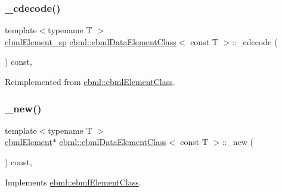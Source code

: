 \subsubsection{\texorpdfstring{\+\_\+cdecode()}{\_cdecode()}\hspace{0.1cm}{\footnotesize\ttfamily [2/2]}}
{\footnotesize\ttfamily template$<$typename T $>$ \\
\mbox{\hyperlink{namespaceebml_adad533b7705a16bb360fe56380c5e7be}{ebml\+Element\+\_\+sp}} \mbox{\hyperlink{classebml_1_1ebmlDataElementClass}{ebml\+::ebml\+Data\+Element\+Class}}$<$ const T $>$\+::\+\_\+cdecode (\begin{DoxyParamCaption}\item[{const \mbox{\hyperlink{classebml_1_1parseFile}{parse\+File}} \&}]{ }\end{DoxyParamCaption}) const\hspace{0.3cm}{\ttfamily [protected]}, {\ttfamily [virtual]}}



Reimplemented from \mbox{\hyperlink{classebml_1_1ebmlElementClass_ae423476637d4ca052cd7aa0047f2b3eb}{ebml\+::ebml\+Element\+Class}}.

\mbox{\label{classebml_1_1ebmlDataElementClass_3_01const_01T_01_4_ac0f96ad77925a1236e1a637db0d5a356}} 
\subsubsection{\texorpdfstring{\+\_\+new()}{\_new()}}
{\footnotesize\ttfamily template$<$typename T $>$ \\
\mbox{\hyperlink{classebml_1_1ebmlElement}{ebml\+Element}}$\ast$ \mbox{\hyperlink{classebml_1_1ebmlDataElementClass}{ebml\+::ebml\+Data\+Element\+Class}}$<$ const T $>$\+::\+\_\+new (\begin{DoxyParamCaption}{ }\end{DoxyParamCaption}) const\hspace{0.3cm}{\ttfamily [protected]}, {\ttfamily [virtual]}}



Implements \mbox{\hyperlink{classebml_1_1ebmlElementClass_a223ede6b8bc3c85251d2d73f0256fb45}{ebml\+::ebml\+Element\+Class}}.

